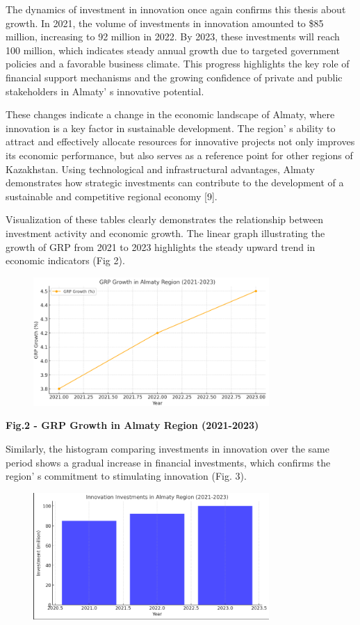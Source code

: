 The dynamics of investment in innovation once again confirms this thesis
about growth. In 2021, the volume of investments in innovation amounted
to \$85 million, increasing to 92 million in 2022. By 2023, these
investments will reach 100 million, which indicates steady annual growth
due to targeted government policies and a favorable business climate.
This progress highlights the key role of financial support mechanisms
and the growing confidence of private and public stakeholders in
Almaty' s innovative potential.

These changes indicate a change in the economic landscape of Almaty,
where innovation is a key factor in sustainable development. The
region' s ability to attract and effectively allocate
resources for innovative projects not only improves its economic
performance, but also serves as a reference point for other regions of
Kazakhstan. Using technological and infrastructural advantages, Almaty
demonstrates how strategic investments can contribute to the development
of a sustainable and competitive regional economy {[}9{]}.

Visualization of these tables clearly demonstrates the relationship
between investment activity and economic growth. The linear graph
illustrating the growth of GRP from 2021 to 2023 highlights the steady
upward trend in economic indicators (Fig 2).

\begin{figure}[H]
	\centering
	\includegraphics[width=0.8\textwidth]{media/ekon2/image4}
	\caption*{}
\end{figure}


{\bfseries Fig.2 - GRP Growth in Almaty Region (2021-2023)}

Similarly, the histogram comparing investments in innovation over the
same period shows a gradual increase in financial investments, which
confirms the region' s commitment to stimulating
innovation (Fig. 3).

\begin{figure}[H]
	\centering
	\includegraphics[width=0.8\textwidth]{media/ekon2/image5}
	\caption*{}
\end{figure}


